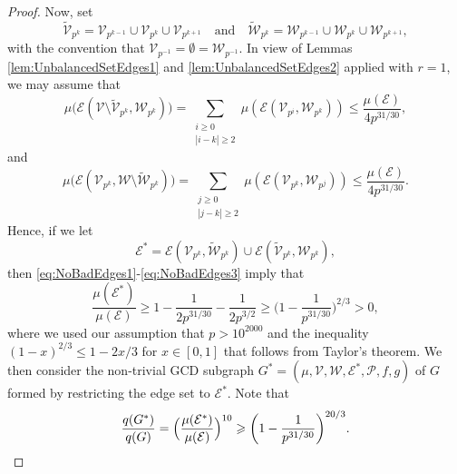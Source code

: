 \documentclass[12pt]{amsart}
\numberwithin{equation}{section}
\theoremstyle{definition}
\theoremstyle{remark}
\newcommand{\CE}{\mathcal{E}}
\newcommand{\CP}{\mathcal{P}}
\newcommand{\CV}{\mathcal{V}}
\newcommand{\CW}{\mathcal{W}}
\newcommand{\eq}[1]{ \begin{equation} \begin{split} #1 \end{split} \end{equation} }
\renewcommand{\tilde}{\widetilde}
\renewcommand{\le}{\leqslant}
\renewcommand{\ge}{\geqslant}
\begin{document}
\begin{proof}
Now, set
\[
\tilde{\CV}_{p^k}=\CV_{p^{k-1}}\cup\CV_{p^k}\cup\CV_{p^{k+1}}
\quad\text{and}\quad
\tilde{\CW}_{p^k}=\CW_{p^{k-1}}\cup\CW_{p^k}\cup\CW_{p^{k+1}} ,
\]
with the convention that $\CV_{p^{-1}}=\emptyset=\CW_{p^{-1}}$. 
In view of Lemmas \ref{lem:UnbalancedSetEdges1} and \ref{lem:UnbalancedSetEdges2} applied with $r=1$, we may assume that 
\begin{equation}\label{eq:NoBadEdges2}
\mu\big(\CE(\CV\setminus\tilde{\CV}_{p^k},\CW_{p^k})\big)
	= \sum_{\substack{i\ge0 \\ |i-k|\ge2}} \mu(\CE(\CV_{p^i},\CW_{p^k})) \le \frac{\mu(\CE)}{4p^{31/30}},
\end{equation}
and
\begin{equation}\label{eq:NoBadEdges3}
\mu\big(\CE(\CV_{p^k},\CW\setminus\tilde{\CW}_{p^k})\big)
	= \sum_{\substack{j\ge0 \\ |j-k|\ge2}} \mu(\CE(\CV_{p^k},\CW_{p^j})) \le \frac{\mu(\CE)}{4p^{31/30}} .
\end{equation}
Hence, if we let
\[
\CE^*=\CE(\CV_{p^k},\tilde{\CW}_{p^k})\cup \CE(\tilde{\CV}_{p^k},\CW_{p^k}) ,
\]
then \eqref{eq:NoBadEdges1}-\eqref{eq:NoBadEdges3} imply that
\[
\frac{\mu(\CE^*)}{\mu(\CE)} \ge 1- \frac{1}{2p^{31/30}} - \frac{1}{2p^{3/2}} 
			\ge \bigg(1-\frac{1}{p^{31/30}}\bigg)^{2/3} >0 ,
\]
where we used our assumption that $p>10^{2000}$ and the inequality $(1-x)^{2/3}\le 1-2x/3$ for $x\in[0,1]$ that follows from Taylor's theorem. We then consider the non-trivial GCD subgraph $G^*=(\mu,\CV,\CW,\CE^*,\CP,f,g)$ of $G$ formed by restricting the edge set to $\CE^*$. Note that
\eq{\label{G^*/G}
\frac{q(G^*)}{q(G)}=\Bigl(\frac{\mu(\CE^*)}{\mu(\CE)}\Bigr)^{10} \ge \bigg(1-\frac{1}{p^{31/30}}\bigg)^{20/3}.
}


\end{proof}
\end{document}
